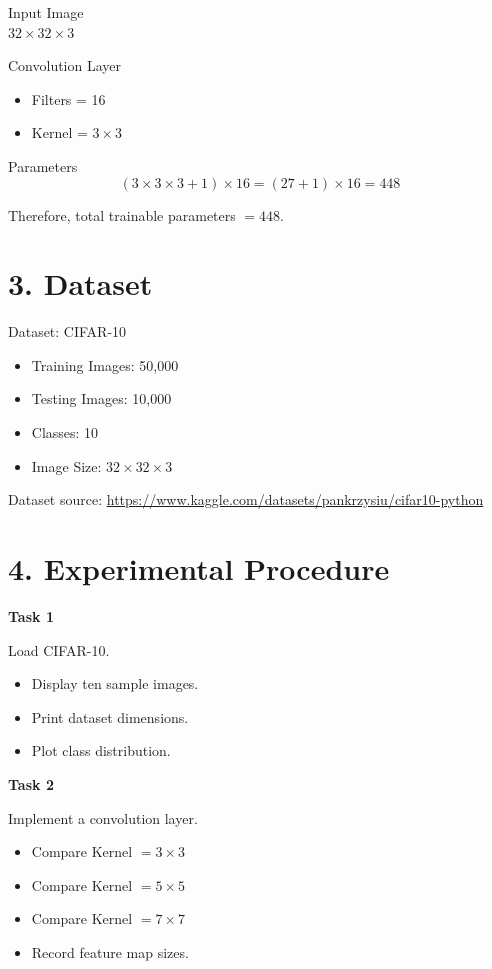 \documentclass[11pt]{article}
\begin{document}
Input Image\\
$32\times32\times3$

Convolution Layer
\begin{itemize}
\item Filters = 16
\item Kernel = $3\times3$
\end{itemize}

Parameters
\[
(3\times3\times3+1)\times16=(27+1)\times16=448
\]

Therefore, total trainable parameters $=448$.

\vspace{6mm}
\section*{3. Dataset}
Dataset: CIFAR-10

\begin{itemize}
\item Training Images: 50,000
\item Testing Images: 10,000
\item Classes: 10
\item Image Size: $32\times32\times3$
\end{itemize}

Dataset source: \url{https://www.kaggle.com/datasets/pankrzysiu/cifar10-python}

\vspace{6mm}
\section*{4. Experimental Procedure}

\textbf{Task 1}

Load CIFAR-10.
\begin{itemize}
\item Display ten sample images.
\item Print dataset dimensions.
\item Plot class distribution.
\end{itemize}

\vspace{4mm}
\textbf{Task 2}

Implement a convolution layer.
\begin{itemize}
\item Compare Kernel $=3\times3$
\item Compare Kernel $=5\times5$
\item Compare Kernel $=7\times7$
\item Record feature map sizes.
\end{itemize}
\end{document}

